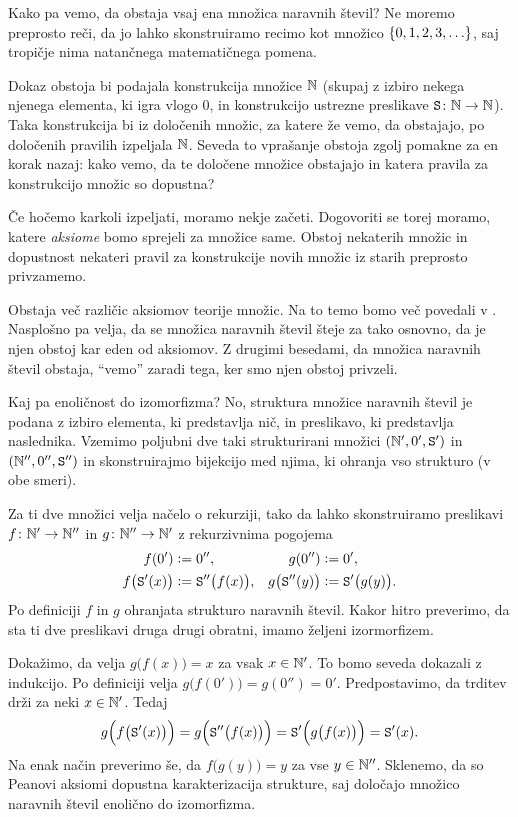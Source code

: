 Kako pa vemo, da obstaja vsaj ena množica naravnih števil? Ne moremo preprosto reči, da jo lahko skonstruiramo recimo kot množico $\set{0, 1, 2, 3,\ldots}$, saj tropičje nima natančnega matematičnega pomena.

Dokaz obstoja bi podajala konstrukcija množice $\mathbb{N}$ (skupaj z izbiro nekega njenega elementa, ki igra vlogo $0$, in konstrukcijo ustrezne preslikave $\mathtt{S}\colon \mathbb{N} \to \mathbb{N}$). Taka konstrukcija bi iz določenih množic, za katere že vemo, da obstajajo, po določenih pravilih izpeljala $\mathbb{N}$. Seveda to vprašanje obstoja zgolj pomakne za en korak nazaj: kako vemo, da te določene množice obstajajo in katera pravila za konstrukcijo množic so dopustna?

Če hočemo karkoli izpeljati, moramo nekje začeti. Dogovoriti se torej moramo, katere \emph{aksiome} bomo sprejeli za množice same. Obstoj nekaterih množic in dopustnost nekateri pravil za konstrukcije novih množic iz starih preprosto privzamemo.

Obstaja več različic aksiomov teorije množic. Na to temo bomo več povedali v . Nasplošno pa velja, da se množica naravnih števil šteje za tako osnovno, da je njen obstoj kar eden od aksiomov.  Z drugimi besedami, da množica naravnih števil obstaja, ``vemo'' zaradi tega, ker smo njen obstoj privzeli.

Kaj pa enoličnost do izomorfizma? No, struktura množice naravnih števil je podana z izbiro elementa, ki predstavlja nič, in preslikavo, ki predstavlja naslednika. Vzemimo poljubni dve taki strukturirani množici $(\mathbb{N}', 0', \mathtt{S}')$ in $(\mathbb{N}'', 0'', \mathtt{S}'')$ in skonstruirajmo bijekcijo med njima, ki ohranja vso strukturo (v obe smeri).

Za ti dve množici velja načelo o rekurziji, tako da lahko skonstruiramo preslikavi $f\colon \mathbb{N}' \to \mathbb{N}''$ in $g\colon \mathbb{N}'' \to \mathbb{N}'$ z rekurzivnima pogojema
\begin{align*}
f(0') &\mathrel{\mathop:}= 0'', & g(0'') &\mathrel{\mathop:}= 0', \\
f\big(\mathtt{S}'(x)\big) &\mathrel{\mathop:}= \mathtt{S}''\big(f(x)\big), & g\big(\mathtt{S}''(y)\big) &\mathrel{\mathop:}= \mathtt{S}'\big(g(y)\big).
\end{align*}
Po definiciji $f$ in $g$ ohranjata strukturo naravnih števil. Kakor hitro preverimo, da sta ti dve preslikavi druga drugi obratni, imamo željeni izormorfizem.

Dokažimo, da velja $g\big(f(x)\big) = x$ za vsak $x \in \mathbb{N}'$. To bomo seveda dokazali z indukcijo. Po definiciji velja $g\big(f(0')\big) = g(0'') = 0'$. Predpostavimo, da trditev drži za neki $x \in \mathbb{N}'$. Tedaj
\[g\Big(f\big(\mathtt{S}'(x)\big)\Big) = g\Big(\mathtt{S}''\big(f(x)\big)\Big) = \mathtt{S}'\Big(g\big(f(x)\big)\Big) = \mathtt{S}'(x).\]
Na enak način preverimo še, da $f\big(g(y)\big) = y$ za vse $y \in \mathbb{N}''$. Sklenemo, da so Peanovi aksiomi dopustna karakterizacija strukture, saj določajo množico naravnih števil enolično do izomorfizma.

